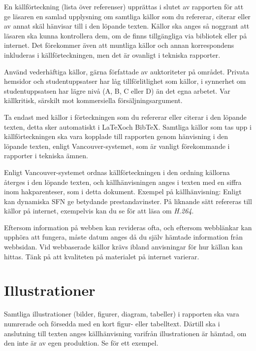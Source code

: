 En källförteckning (lista över referenser) upprättas i slutet av rapporten för 
att ge läsaren en samlad upplysning om samtliga källor som du refererar, 
citerar eller av annat skäl hänvisar till i den löpande texten.
Källor ska anges så noggrant att läsaren ska kunna kontrollera dem, om de finns 
tillgängliga via bibliotek eller på internet.
Det förekommer även att muntliga källor och annan korrespondens inkluderas 
i källförteckningen, men det är ovanligt i tekniska rapporter.

Använd vederhäftiga källor, gärna författade av auktoriteter på området.
Privata hemsidor och studentuppsatser har låg tillförlitlighet som källor, 
i synnerhet om studentuppsatsen har lägre nivå (A, B, C eller D) än det egna 
arbetet.
Var källkritisk, särskilt mot kommersiella försäljningsargument.

Ta endast med källor i förteckningen som du refererar eller citerar i den 
löpande texten, detta sker automatiskt i \LaTeX och Bib\TeX.
Samtliga källor som tas upp i källförteckningen ska vara kopplade till 
rapporten genom hänvisning i den löpande texten, enligt Vancouver-systemet, som 
är vanligt förekommande i rapporter i tekniska ämnen.

Enligt Vancouver-systemet ordnas källförteckningen i den ordning källorna 
återges i den löpande texten, och källhänvisningen anges i texten med en siffra 
inom hakparenteser, som i detta dokument.
Exempel på källhänvisning:
Enligt \citet{Eriksson2001dsf} kan dynamiska SFN ge betydande prestandavinster.
På liknande sätt refereras till källor på internet, exempelvis kan du se 
\citet{Wikipedia2010h264} för att läsa om \emph{H.264}.

Eftersom information på webben kan revideras ofta, och eftersom webblänkar kan 
upphöra att fungera, måste datum anges då du själv hämtade information från 
webbsidan.
Vid webbaserade källor krävs ibland anvisningar för hur källan kan hittas. Tänk 
på att kvaliteten på materialet på internet varierar.


\section{Illustrationer}
\label{sec:illustrations}
\noindent
Samtliga illustrationer (bilder, figurer, diagram, tabeller) i rapporten ska 
vara numrerade och försedda med en kort figur- eller tabelltext.
Därtill ska i anslutning till texten anges källhänvisning varifrån 
illustrationen är hämtad, om den inte är av egen produktion.
Se  för ett exempel.

